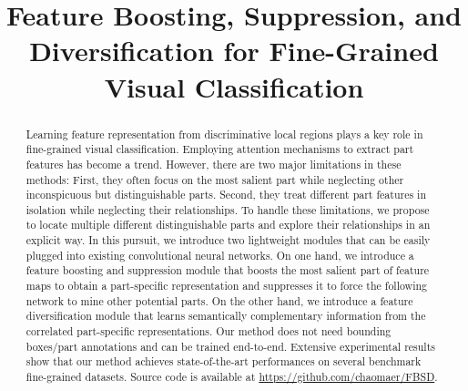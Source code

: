 \documentclass[conference]{IEEEtran}
\begin{document}
	
	\title{
		Feature Boosting, Suppression, and Diversification for Fine-Grained Visual Classification
	}
	
	\author{
}
	
	\maketitle
	
	\begin{abstract}
		Learning feature representation from discriminative local regions plays a key role in
		fine-grained visual classification. Employing attention mechanisms to extract part features has
		become a trend. However, there are two major limitations in these methods:
		First, they often focus on the most salient part while
		neglecting other inconspicuous but distinguishable parts. Second, they
		treat different part features in isolation while neglecting their relationships. To handle these limitations, we propose to locate multiple different
		distinguishable parts and explore their relationships in an explicit way. In this
		pursuit, we introduce two lightweight modules that can be
		easily plugged into existing convolutional neural networks.
		On one hand, we introduce a feature boosting and suppression module that boosts the most salient part of feature maps
		to obtain a part-specific representation and suppresses it to force the following network to mine other potential parts. On the other hand, we introduce a feature diversification module that learns semantically complementary information from the correlated part-specific representations.
		Our method does not need bounding boxes/part annotations
		and can be trained end-to-end. Extensive experimental results
		show that our method achieves state-of-the-art performances
		on several benchmark fine-grained datasets. Source code is available at \url{https://github.com/chaomaer/FBSD}.
	\end{abstract}
	
\end{document}
